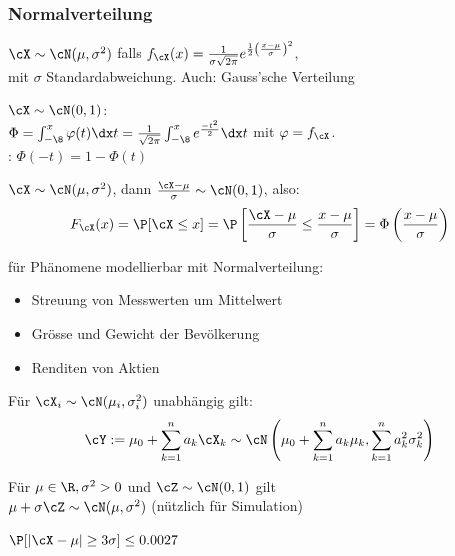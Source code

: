 \subsubsection{Normalverteilung}
\label{sec:dist-normal}
\shortdefinition $\cX \sim \cN(\mu, \sigma^2)$ falls $f_\cX(x) = \frac{1}{\sigma \sqrt{2\pi}} e^{\frac{1}{2} \left( \frac{x - \mu}{\sigma} \right)^2}$,\\
mit $\sigma$ Standardabweichung. Auch: Gauss'sche Verteilung

\shortdefinition[Standardnormalverteilung] $\cX \sim \cN(0, 1)$:\\
$\Phi = \int_{-\8}^{x} \varphi(t) \dx t = \frac{1}{\sqrt{2\pi}} \int_{-\8}^{x} e^\frac{-t^2}{2} \dx t$ mit $\varphi = f_\cX$.\\
: $\Phi(-t) = 1 - \Phi(t)$

\shorttheorem $\cX \sim \cN(\mu, \sigma^2)$, dann $\frac{\cX - \mu}{\sigma} \sim \cN(0, 1)$, also:
\[
    F_\cX(x) = \P[\cX \leq x] = \P\left[ \frac{\cX - \mu}{\sigma} \leq \frac{x - \mu}{\sigma} \right] = \Phi \left( \frac{x - \mu}{\sigma} \right)
\]

\shortexample für Phänomene modellierbar mit Normalverteilung:
\begin{itemize}
    \item Streuung von Messwerten um Mittelwert
    \item Grösse und Gewicht der Bevölkerung
    \item Renditen von Aktien
\end{itemize}

\shortremark Für $\cX_i \sim \cN(\mu_i, \sigma_i^2)$ unabhängig gilt:
\[
    \cY := \mu_0 + \sum_{k = 1}^{n} a_k \cX_k \sim \cN\left( \mu_0 + \sum_{k = 1}^{n} a_k \mu_k, \sum_{k = 1}^{n} a_k^2 \sigma_k^2 \right)
\]

\shortremark Für $\mu \in \R, \sigma^2 > 0$ und $\cZ \sim \cN(0, 1)$ gilt\\
$\mu + \sigma \cZ \sim \cN(\mu, \sigma^2)$ (nützlich für Simulation)

\shortremark $\P[|\cX - \mu| \geq 3\sigma] \leq 0.0027$
